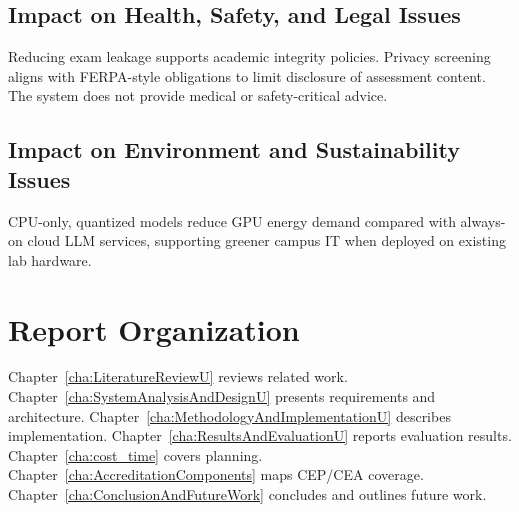 \subsection{Impact on Health, Safety, and Legal Issues}
Reducing exam leakage supports academic integrity policies. Privacy screening aligns with FERPA-style obligations to limit disclosure of assessment content. The system does not provide medical or safety-critical advice.

\subsection{Impact on Environment and Sustainability Issues}
CPU-only, quantized models reduce GPU energy demand compared with always-on cloud LLM services, supporting greener campus IT when deployed on existing lab hardware.

\section{Report Organization}
Chapter~\ref{cha:LiteratureReviewU} reviews related work. Chapter~\ref{cha:SystemAnalysisAndDesignU} presents requirements and architecture. Chapter~\ref{cha:MethodologyAndImplementationU} describes implementation. Chapter~\ref{cha:ResultsAndEvaluationU} reports evaluation results. Chapter~\ref{cha:cost_time} covers planning. Chapter~\ref{cha:AccreditationComponents} maps CEP/CEA coverage. Chapter~\ref{cha:ConclusionAndFutureWork} concludes and outlines future work.
